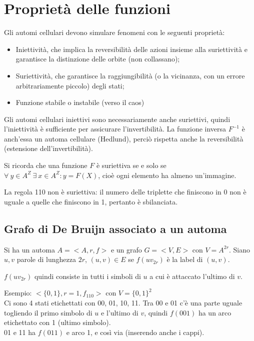 \section{Proprietà delle funzioni}
Gli automi cellulari devono simulare fenomeni con le seguenti proprietà:
\begin{itemize}
	\item Iniettività, che implica la reversibilità delle azioni insieme alla suriettività e garantisce la distinzione delle orbite (non collassano);
	\item Suriettività, che garantisce la raggiungibilità (o la vicinanza, con un errore arbitrariamente piccolo) degli stati; 
	\item Funzione stabile o instabile (verso il caos)
\end{itemize}

Gli automi cellulari iniettivi sono necessariamente anche suriettivi, quindi l'iniettività è sufficiente per assicurare l'invertibilità. La funzione inversa $F^{-1}$ è anch'essa un automa cellulare (Hedlund), perciò rispetta anche la reversibilità (estensione dell'invertibilità).

Si ricorda che una funzione $F$ è suriettiva se e solo se $\forall\ y \in A^Z\ \exists\ x \in A^Z : y = F(X)$, cioè ogni elemento ha almeno un'immagine. 

La regola 110 non è suriettiva: il numero delle triplette che finiscono in 0 non è uguale a quelle che finiscono in 1, pertanto è sbilanciata. 

\subsection{Grafo di De Bruijn associato a un automa}
Si ha un automa $A = <A, r, f>$ e un grafo $G = <V, E>$ con $V = A^{2r}$. Siano $u, v$ parole di lunghezza $2r$, $(u, v) \in E$ se $f(uv_{2r})$ è la label di $(u, v)$.

$f(uv_{2r})$ quindi consiste in tutti i simboli di $u$ a cui è attaccato l'ultimo di $v$. 

Esempio: $< \{0, 1\}, r = 1, f_{110} >$ con $V = \{0, 1\}^2$ \\
Ci sono 4 stati etichettati con 00, 01, 10, 11. Tra 00 e 01 c'è una parte uguale togliendo il primo simbolo di $u$ e l'ultimo di $v$, quindi $f(001)$ ha un arco etichettato con 1 (ultimo simbolo). \\
01 e 11 ha $f(011)$ e arco 1, e così via (inserendo anche i cappi). 

